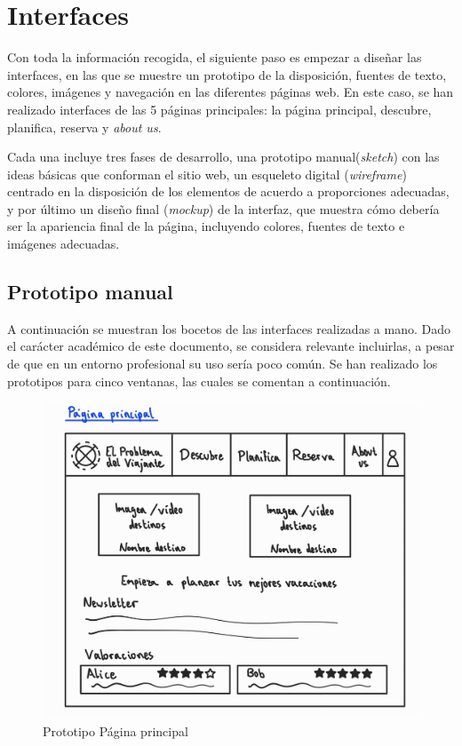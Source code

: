 \documentclass[11pt, a4paper]{book}
\begin{document}
	
	
	\section{Interfaces}
	Con toda la información recogida, el siguiente paso es empezar a diseñar las interfaces, en las que se muestre un prototipo de la disposición, fuentes de texto, colores, imágenes y navegación en las diferentes páginas web. En este caso, se han realizado interfaces de las 5 páginas principales: la página principal, descubre, planifica, reserva y \textit{about us}. 
	
	Cada una incluye tres fases de desarrollo, una prototipo manual(\textit{sketch}) con las ideas básicas que conforman el sitio web, un esqueleto digital (\textit{wireframe}) centrado en la disposición de los elementos de acuerdo a proporciones adecuadas, y por último un diseño final (\textit{mockup}) de la interfaz, que muestra cómo debería ser la apariencia final de la página, incluyendo colores, fuentes de texto e imágenes adecuadas.
	
	\subsection{Prototipo manual}
	A continuación se muestran los bocetos de las interfaces realizadas a mano. Dado el carácter académico de este documento, se considera relevante incluirlas, a pesar de que en un entorno profesional su uso sería poco común. Se han realizado los prototipos para cinco ventanas, las cuales se comentan a continuación.
	
	\newpage %
	
	\begin{figure} [H]
		\centering
		\includegraphics[width=\textwidth]{1-principal.jpg}
		\caption{Prototipo Página principal}
	\end{figure} 
\end{document}
